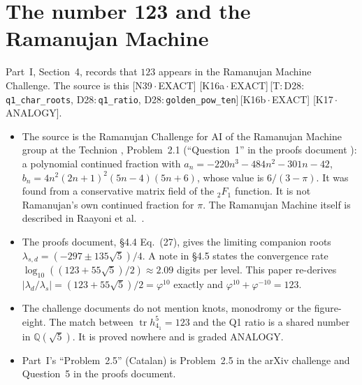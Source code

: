 \documentclass[11pt]{article}
\theoremstyle{definition}
\newcommand{\lean}[1]{\texttt{\small #1}}
\newcommand{\dtag}[1]{#1}
\begin{document}
\section{The number 123 and the Ramanujan Machine}\label{sec:rm}
Part~I, Section~4, records that $123$ appears in the Ramanujan Machine Challenge. The source is this \dtag{\textsf{\small[N39\,$\cdot$\,EXACT]} \textsf{\small[K16a\,$\cdot$\,EXACT]}\,\textsf{\small[T:\,D28:\,\lean{q1\_\allowbreak{}char\_\allowbreak{}roots}, D28:\,\lean{q1\_\allowbreak{}ratio}, D28:\,\lean{golden\_\allowbreak{}pow\_\allowbreak{}ten}]}\,\textsf{\small[K16b\,$\cdot$\,EXACT]} \textsf{\small[K17\,$\cdot$\,ANALOGY]}}.
\begin{itemize}[leftmargin=2em]
\item The source is the Ramanujan Challenge for AI of the Ramanujan Machine group at the Technion \cite{RMchallenge}, Problem~2.1 (``Question~1'' in the proofs document \cite{RMproofs}): a polynomial continued fraction with $a_n=-220n^3-484n^2-301n-42$, $b_n=4n^2(2n+1)^2(5n-4)(5n+6)$, whose value is $6/(3-\pi)$. It was found from a conservative matrix field of the ${}_2F_1$ function. It is not Ramanujan's own continued fraction for $\pi$. The Ramanujan Machine itself is described in Raayoni et al.\ \cite{Raayoni}.
\item The proofs document, \S4.4 Eq.~(27), gives the limiting companion roots $\lambda_{s,d}=(-297\pm135\sqrt5)/4$. A note in \S4.5 states the convergence rate $\log_{10}((123+55\sqrt5)/2)\approx2.09$ digits per level. This paper re-derives $|\lambda_d/\lambda_s|=(123+55\sqrt5)/2=\varphi^{10}$ exactly and $\varphi^{10}+\varphi^{-10}=123$.
\item The challenge documents do not mention knots, monodromy or the figure-eight. The match between $\operatorname{tr}h_{4_1}^5=123$ and the Q1 ratio is a shared number in $\mathbb Q(\sqrt5)$. It is proved nowhere and is graded ANALOGY.
\item Part~I's ``Problem~2.5'' (Catalan) is Problem~2.5 in the arXiv challenge and Question~5 in the proofs document.
\end{itemize}
\end{document}
